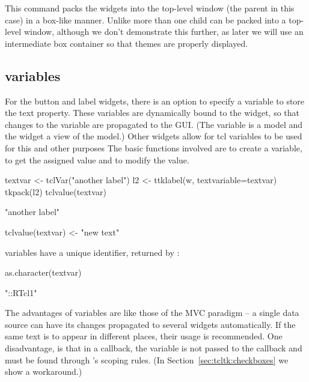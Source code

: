 This command packs the widgets into the top-level window (the parent
in this case) in a box-like manner. Unlike \GTK\/ more than one child
can be packed into a top-level window, although we don't demonstrate
this further, as later we will use an intermediate 
box container so that themes are properly displayed.

\subsection{\TCL\/ variables}
\label{sec:tcltk:overview:textvariables}


For the button and label widgets, there is an option
 to specify a \TCL\/ variable to store the text
property. These variables are dynamically bound to the widget, so that
changes to the variable are propagated to the GUI. (The \TCL\/
variable is a model and the widget a view of the model.)  Other
widgets allow for tcl variables to be used for this and other purposes
The basic functions involved are  to create a \TCL\/
variable,  to get the assigned value and
 to modify the value.

\begin{Schunk}
\begin{Sinput}
 textvar <- tclVar("another label")
 l2 <- ttklabel(w, textvariable=textvar)
 tkpack(l2)
 tclvalue(textvar)
\end{Sinput}
\begin{Soutput}
[1] "another label"
\end{Soutput}
\begin{Sinput}
 tclvalue(textvar) <- "new text"         
\end{Sinput}
\end{Schunk}

\TCL\/ variables have a unique identifier, returned by :
\begin{Schunk}
\begin{Sinput}
 as.character(textvar)
\end{Sinput}
\begin{Soutput}
[1] "::RTcl1"
\end{Soutput}
\end{Schunk}

The advantages of \TCL\/ variables are like those of the MVC paradigm
-- a single data source can have its changes propagated to several
widgets automatically. If the same text is to appear in different
places, their usage is recommended.  One disadvantage, is that in a
callback, the variable is not passed to the callback and must be found
through \R's scoping rules. (In Section~\ref{sec:tcltk:checkboxes} we
show a workaround.)

